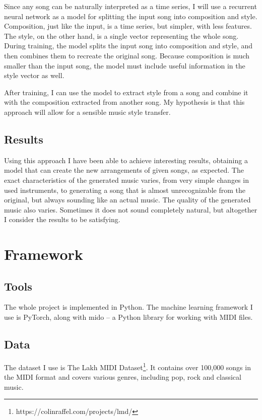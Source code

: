 \documentclass[en]{pracamgr}
\begin{document}
Since any song can be naturally interpreted as a time series, I will use a recurrent neural network as a model for splitting the input song into composition and style.
Composition, just like the input, is a time series, but simpler, with less features.
The style, on the other hand, is a single vector representing the whole song.
During training, the model splits the input song into composition and style, and then combines them to recreate the original song.
Because composition is much smaller than the input song, the model must include useful information in the style vector as well.

After training, I can use the model to extract style from a song and combine it with the composition extracted from another song.
My hypothesis is that this approach will allow for a sensible music style transfer.

\section{Results}

Using this approach I have been able to achieve interesting results, obtaining a model that can create the new arrangements of given songs, as expected.
The exact characteristics of the generated music varies, from very simple changes in used instruments, to generating a song that is almost unrecognizable from the original, but always sounding like an actual music.
The quality of the generated music also varies. Sometimes it does not sound completely natural, but altogether I consider the results to be satisfying.

\chapter{Framework}

\section{Tools}

The whole project is implemented in Python.
The machine learning framework I use is PyTorch, along with mido -- a Python library for working with MIDI files.

\section{Data}

The dataset I use is The Lakh MIDI Dataset\footnote{https://colinraffel.com/projects/lmd/}.
It contains over 100,000 songs in the MIDI format and covers various genres, including pop, rock and classical music.
\end{document}
